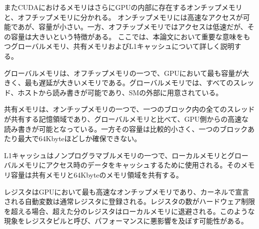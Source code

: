 \documentclass[a4paper,11pt,oneside,openany]{jsbook}
\begin{document}
またCUDAにおけるメモリはさらにGPUの内部に存在するオンチップメモリと、オフチップメモリに分かれる。
オンチップメモリには高速なアクセスが可能であが、容量が小さい。一方、オフチップメモリではアクセスは低速だが、その容量は大きいという特徴がある。
ここでは、本論文において重要な意味をもつグローバルメモリ、共有メモリおよびL1キャッシュについて詳しく説明する。

グローバルメモリは、オフチップメモリの一つで、GPUにおいて最も容量が大きく、最も遅延が大きいメモリである。グローバルメモリでは、すべてのスレッド、ホストから読み書きが可能であり、SMの外部に用意されている。

共有メモリは、オンチップメモリの一つで、一つのブロック内の全てのスレッドが共有する記憶領域であり、グローバルメモリと比べて、GPU側からの高速な読み書きが可能となっている。一方その容量は比較的小さく、一つのブロックあたり最大で64Kbyteほどしか確保できない。

L1キャッシュはノンプログラマブルメモリの一つで、ローカルメモリとグローバルメモリにアクセス時のデータをキャッシュするために使用される。そのメモリ容量は共有メモリと64Kbyteのメモリ領域を共有する。

レジスタはGPUにおいて最も高速なオンチップメモリであり、カーネルで宣言される自動変数は通常レジスタに登録される。レジスタの数がハードウェア制限を超える場合、超えた分のレジスタはローカルメモリに退避される。このような現象をレジスタピルと呼び、パフォーマンスに悪影響を及ぼす可能性がある。



\end{document}

